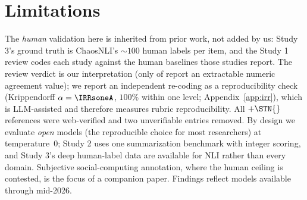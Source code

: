 \section{Limitations}
The \emph{human} validation here is inherited from prior work, not added by us: Study 3's ground truth is ChaosNLI's
${\sim}100$ human labels per item, and the Study 1 review codes each study against the human baselines those studies
report. The review verdict is our interpretation (only \Nnumeric{} of \Nstudies{} report an extractable numeric
agreement value); we report an independent re-coding as a reproducibility check (Krippendorff $\alpha=\IRRsoneA$,
$100\%$ within one level; Appendix~\ref{app:irr}), which is LLM-assisted and therefore measures rubric
reproducibility. All \Nstudies{}${+}\STN{}$ references were web-verified and two unverifiable entries removed.
By design we evaluate \emph{open} models (the reproducible choice for most researchers) at temperature~0; Study 2
uses one summarization benchmark with integer scoring, and Study 3's deep human-label data are available for NLI
rather than every domain. Subjective social-computing annotation, where the human ceiling is contested, is the focus
of a companion paper. Findings reflect models available through mid-2026.
